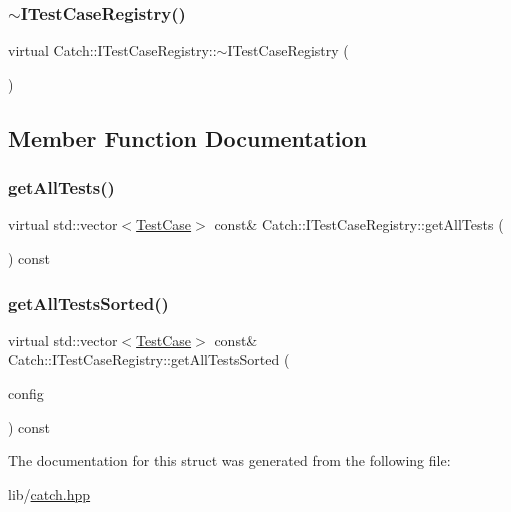\subsubsection{\texorpdfstring{$\sim$\+I\+Test\+Case\+Registry()}{~ITestCaseRegistry()}}
{\footnotesize\ttfamily virtual Catch\+::\+I\+Test\+Case\+Registry\+::$\sim$\+I\+Test\+Case\+Registry (\begin{DoxyParamCaption}{ }\end{DoxyParamCaption})\hspace{0.3cm}{\ttfamily [virtual]}}



\subsection{Member Function Documentation}
\hypertarget{struct_catch_1_1_i_test_case_registry_ad6e4d4a621655123f73ae98cfeda063d}{}\label{struct_catch_1_1_i_test_case_registry_ad6e4d4a621655123f73ae98cfeda063d} 
\subsubsection{\texorpdfstring{get\+All\+Tests()}{getAllTests()}}
{\footnotesize\ttfamily virtual std\+::vector$<$\hyperlink{class_catch_1_1_test_case}{Test\+Case}$>$ const\& Catch\+::\+I\+Test\+Case\+Registry\+::get\+All\+Tests (\begin{DoxyParamCaption}{ }\end{DoxyParamCaption}) const\hspace{0.3cm}{\ttfamily [pure virtual]}}

\hypertarget{struct_catch_1_1_i_test_case_registry_a33e46639d0319d35497c05bb5d02be5a}{}\label{struct_catch_1_1_i_test_case_registry_a33e46639d0319d35497c05bb5d02be5a} 
\subsubsection{\texorpdfstring{get\+All\+Tests\+Sorted()}{getAllTestsSorted()}}
{\footnotesize\ttfamily virtual std\+::vector$<$\hyperlink{class_catch_1_1_test_case}{Test\+Case}$>$ const\& Catch\+::\+I\+Test\+Case\+Registry\+::get\+All\+Tests\+Sorted (\begin{DoxyParamCaption}\item[{I\+Config const \&}]{config }\end{DoxyParamCaption}) const\hspace{0.3cm}{\ttfamily [pure virtual]}}



The documentation for this struct was generated from the following file\+:\begin{DoxyCompactItemize}
\item 
lib/\hyperlink{catch_8hpp}{catch.\+hpp}\end{DoxyCompactItemize}
